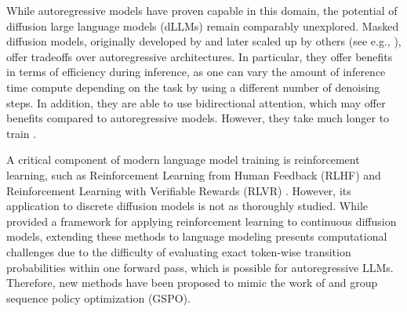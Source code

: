 While autoregressive models have proven capable in this domain, the potential of diffusion large language models (dLLMs) remain comparably unexplored. Masked diffusion models, originally developed by \citeauthor{austin2021structureddenoisingdiffusionmodels} \cite{austin2021structureddenoisingdiffusionmodels} and later scaled up by others (see e.g., \cite{nie2025largelanguagediffusionmodels, ye2025dream7bdiffusionlarge}), offer tradeoffs over autoregressive architectures. In particular, they offer benefits in terms of efficiency during inference, as one can vary the amount of inference time compute depending on the task by using a different number of denoising steps. In addition, they are able to use bidirectional attention, which may offer benefits compared to autoregressive models. However, they take much longer to train \cite{nie2025scalingmaskeddiffusionmodels}.

A critical component of modern language model training is reinforcement learning, such as Reinforcement Learning from Human Feedback (RLHF) and Reinforcement Learning with Verifiable Rewards (RLVR) \cite{shao2024deepseekmathpushinglimitsmathematical, ouyang2022traininglanguagemodelstofollowinstructionswithhumanfeedback, lambert2025tulu}. However, its application to discrete diffusion models is not as thoroughly studied. While \citeauthor{black2024trainingdiffusionmodelsreinforcement} \cite{black2024trainingdiffusionmodelsreinforcement} provided a framework for applying reinforcement learning to continuous diffusion models, extending these methods to language modeling presents computational challenges due to the difficulty of evaluating exact token-wise transition probabilities within one forward pass, which is possible for autoregressive LLMs. Therefore, new methods have been proposed to mimic the work of \citeauthor{zheng2025groupsequencepolicyoptimization} \cite{zheng2025groupsequencepolicyoptimization} and group sequence policy optimization (GSPO).


